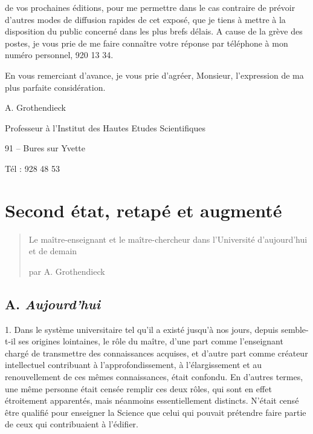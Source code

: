 \documentclass[11pt,a4paper]{article}
\begin{document}
de vos prochaines éditions, pour me permettre dans le cas contraire de
prévoir d'autres modes de diffusion rapides de cet exposé, que je tiens
à mettre à la disposition du public concerné dans les plus brefs délais.
A cause de la grève des postes, je vous prie de me faire connaître votre
réponse par téléphone à mon numéro personnel, 920 13 34.

En vous remerciant d'avance, je vous prie d'agréer, Monsieur,
l'expression de ma plus parfaite considération.


A. Grothendieck

Professeur à l'Institut des Hautes Etudes Scientifiques

91 -- Bures sur Yvette

Tél : 928 48 53

\section*{Second état, retapé et augmenté}


\begin{quote}
Le maître-enseignant et le maître-chercheur dans l'Université d'aujourd'hui et de demain

par A. Grothendieck
\end{quote}

\subsection*{A. \emph{Aujourd'hui}}

1. Dans le système universitaire tel qu'il a existé jusqu'à nos jours, depuis
semble-t-il ses origines lointaines, le rôle du maître, d'une part comme
l'enseignant chargé de transmettre des connaissances acquises, et d'autre part
comme créateur intellectuel contribuant à l'approfondissement, à
l'élargissement et au renouvellement de ces mêmes connaissances, était confondu. En
d'autres termes, une même personne était censée remplir ces deux rôles, qui
sont en effet étroitement apparentés, mais néanmoins essentiellement distincts.
N'était censé être qualifié pour enseigner la Science que celui qui pouvait
prétendre faire partie de ceux qui contribuaient à l'édifier.
\end{document}
